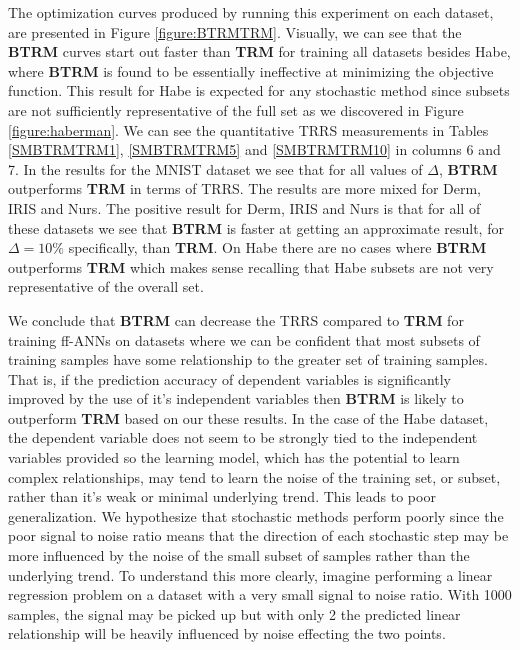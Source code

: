 \documentclass[letterpaper,12pt,titlepage,oneside,final]{book}
\begin{document}
	The optimization curves produced by running this experiment on each dataset, are presented in Figure \ref{figure:BTRMTRM}. Visually, we can see that the \textbf{BTRM} curves start out faster than \textbf{TRM} for training all datasets besides Habe, where \textbf{BTRM} is found to be essentially ineffective at minimizing the objective function. This result for Habe is expected for any stochastic method since subsets are not sufficiently representative of the full set as we discovered in Figure \ref{figure:haberman}. We can see the quantitative TRRS measurements in Tables \ref{SMBTRMTRM1}, \ref{SMBTRMTRM5} and \ref{SMBTRMTRM10} in columns 6 and 7. In the results for the MNIST dataset we see that for all values of $\Delta$, \textbf{BTRM} outperforms \textbf{TRM} in terms of TRRS. The results are more mixed for Derm, IRIS and Nurs. The positive result for Derm, IRIS and Nurs is that for all of these datasets we see that \textbf{BTRM} is faster at getting an approximate result, for $\Delta=10\%$ specifically, than \textbf{TRM}. On Habe there are no cases where \textbf{BTRM} outperforms \textbf{TRM} which makes sense recalling that Habe subsets are not very representative of the overall set.  
	
	We conclude that \textbf{BTRM} can decrease the TRRS compared to \textbf{TRM} for training ff-ANNs on datasets where we can be confident that most subsets of training samples have some relationship to the greater set of training samples. That is, if the prediction accuracy of dependent variables is significantly improved by the use of it's independent variables then \textbf{BTRM} is likely to outperform \textbf{TRM} based on our these results. In the case of the Habe dataset, the dependent variable does not seem to be strongly tied to the independent variables provided so the learning model, which has the potential to learn complex relationships, may tend to learn the noise of the training set, or subset, rather than it's weak or minimal underlying trend. This leads to poor generalization. We hypothesize that stochastic methods perform poorly since the poor signal to noise ratio means that the direction of each stochastic step may be more influenced by the noise of the small subset of samples rather than the underlying trend. To understand this more clearly, imagine performing a linear regression problem on a dataset with a very small signal to noise ratio. With 1000 samples, the signal may be picked up but with only 2 the predicted linear relationship will be heavily influenced by noise effecting the two points. 
	
\end{document}
